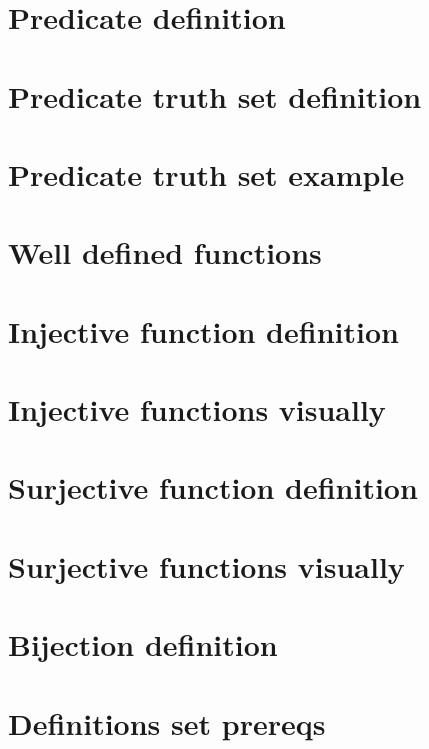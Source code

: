 
\section*{Predicate definition}

\vfill
\section*{Predicate truth set definition}

\vfill
\section*{Predicate truth set example}

\vfill
\section*{Well defined functions}

\vfill
\section*{Injective function definition}

\vfill
\section*{Injective functions visually}

\vfill
\section*{Surjective function definition}

\vfill
\section*{Surjective functions visually}

\vfill
\section*{Bijection definition}

\vfill
\section*{Definitions set prereqs}

\vfill
